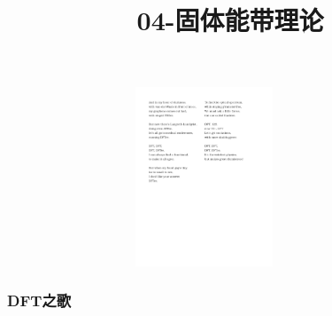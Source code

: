 \frame
{
	\frametitle{}
\begin{figure}[h!]
	\vspace{-10pt}
\centering
\includegraphics[height=2.10in,width=3.8in,viewport=0 350 550 650,clip]{Figures/DFT_song-2.pdf}
\label{DFT_Song_03}
\end{figure}
}

\frame
{
	\frametitle{{\rm DFT}之歌}
\begin{figure}[h!]
	\vspace{-10pt}
\centering
{}     %
\label{DFT_Song_04}
\end{figure}
}

\title{04-固体能带理论}
